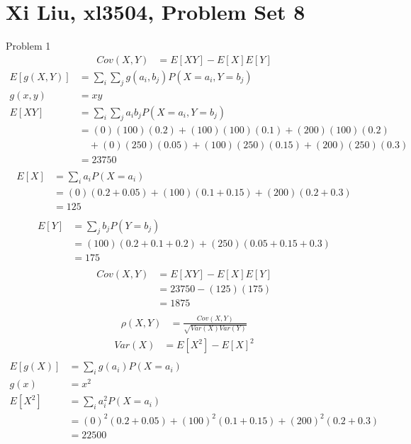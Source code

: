 \documentclass[12pt,border=4pt,multi]{article} %
\begin{document}
\section*{Xi Liu, xl3504, Problem Set 8}
Problem 1\\
\begin{align*}
Cov(X, Y) &= E[XY] - E[X]E[Y]
\end{align*}
\begin{align*}
E[g(X, Y)] &= \sum_i \sum_j g(a_i, b_j) P(X = a_i, Y = b_j)\\
g(x, y) &= xy\\
E[XY] &= \sum_i \sum_j a_i b_j P(X = a_i, Y = b_j)\\
&= (0)(100)(0.2) + (100)(100)(0.1) + (200)(100)(0.2)\\
&\quad+ (0)(250)(0.05) + (100)(250)(0.15) + (200)(250)(0.3)\\
&= 23750\\
\end{align*}
\begin{align*}
E[X] &= \sum_i a_i P(X = a_i)\\
&= (0)(0.2 + 0.05) + (100)(0.1 + 0.15) + (200)(0.2 + 0.3)\\
&= 125\\
\end{align*}
\begin{align*}
E[Y] &= \sum_j b_j P(Y = b_j)\\
&= (100)(0.2 + 0.1 + 0.2) + (250)(0.05 + 0.15 + 0.3)\\
&= 175\\
\end{align*}
\begin{align*}
Cov(X, Y) &= E[XY] - E[X]E[Y]\\
&= 23750 - (125)(175)\\
&= \boxed{1875}\\
\end{align*}
\begin{align*}
\rho(X, Y) &= \frac{Cov(X, Y)}{\sqrt{Var(X) Var(Y)}}
\end{align*}
\begin{align*}
Var(X) &= E[X^2] - E[X]^2\\
\end{align*}
\begin{align*}
E[g(X)] &= \sum_i g(a_i) P(X = a_i)\\
g(x) &= x^2\\
E[X^2] &= \sum_i a_i^2 P(X = a_i)\\
&= (0)^2(0.2 + 0.05) + (100)^2(0.1 + 0.15) + (200)^2(0.2 + 0.3)\\
&= 22500\\
\end{align*} 
\end{document}
